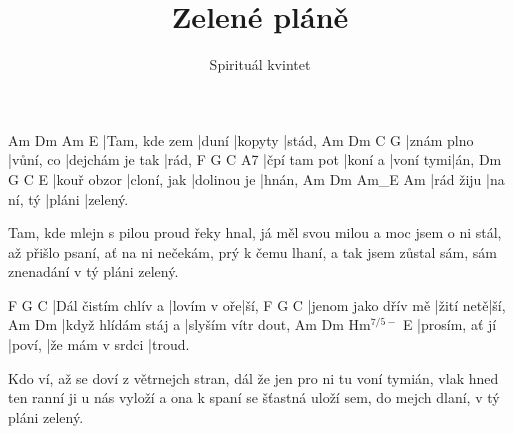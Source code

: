 \documentclass{song}
\title{Zelené pláně}
\author{Spirituál kvintet}
\renewcommand{\-}{$^{7/5-}$}
\begin{document}
\strophe
Am            Dm    Am      E
|Tam, kde zem |duní |kopyty |stád,
Am         Dm        C               G
|znám plno |vůní, co |dejchám je tak |rád,
F            G       C         A7
|čpí tam pot |koní a |voní tymi|án,
Dm          G           C           E
|kouř obzor |cloní, jak |dolinou je |hnán,
Am        Dm         Am_E   Am
|rád žiju |na ní, tý |pláni |zelený.
\endstrophe

\strophe*
Tam, kde mlejn s pilou proud řeky hnal,
já měl svou milou a moc jsem o ni stál,
až přišlo psaní, ať na ni nečekám,
prý k čemu lhaní, a tak jsem zůstal sám,
sám znenadání v tý pláni zelený.
\endstrophe

\strophe
F                   G           C
|Dál čistím chlív a |lovím v oře|ší,
F                   G         C
|jenom jako dřív mě |žití netě|ší,
Am                  Dm
|když hlídám stáj a |slyším vítr dout,
Am             Dm     Hm\-            E
|prosím, ať jí |poví, |že mám v srdci |troud.
\endstrophe

\strophe*
Kdo ví, až se doví z větrnejch stran,
dál že jen pro ni tu voní tymián,
vlak hned ten ranní ji u nás vyloží
a ona k spaní se šťastná uloží
sem, do mejch dlaní, v tý pláni zelený.
\endstrophe
\end{document}
